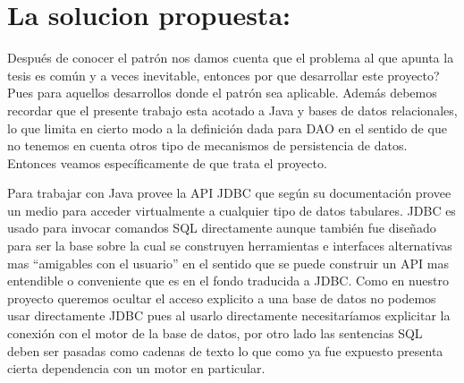 \section{La solucion propuesta: \jj}
Después de conocer el patrón nos damos cuenta que el problema al que apunta la tesis es común y a veces inevitable, entonces por que desarrollar este proyecto? Pues para aquellos desarrollos donde el patrón sea aplicable. Además debemos recordar que el presente trabajo esta acotado a Java y bases de datos relacionales, lo que limita en cierto modo a la definición dada para DAO en el sentido de que no tenemos en cuenta otros tipo de mecanismos de persistencia de datos. Entonces veamos específicamente de que trata el proyecto.

Para trabajar con \dd Java provee la API JDBC\cite{java:jdbc} que según su documentación provee un medio para acceder virtualmente a cualquier tipo de datos tabulares. JDBC es usado para invocar comandos SQL directamente aunque también fue diseñado para ser la base sobre la cual se construyen herramientas e interfaces alternativas mas ``amigables con el usuario'' en el sentido que se puede construir un API mas entendible o conveniente que es en el fondo traducida a JDBC. Como en nuestro proyecto queremos ocultar el acceso explicito a una base de datos no podemos usar directamente JDBC pues al usarlo directamente necesitaríamos explicitar la conexión con el motor de la base de datos, por otro lado las sentencias SQL deben ser pasadas como cadenas de texto lo que como ya fue expuesto presenta cierta dependencia con un motor en particular.


